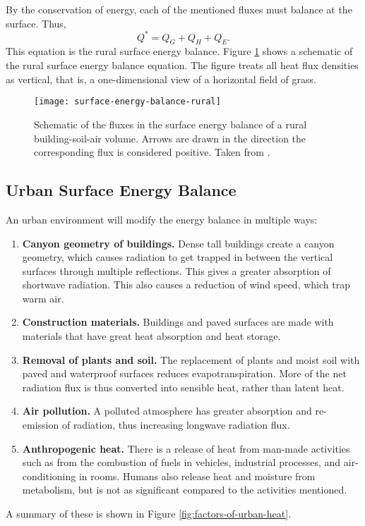 		By the conservation of energy, each of the mentioned fluxes must balance at the surface.
		Thus,
		\begin{equation}
			Q^* = Q_G + Q_H + Q_E.
		\end{equation}
		This equation is the rural surface energy balance.
		Figure \ref{fig:surface-energy-balance-rural} shows a schematic of the rural surface energy balance equation. The figure treats all heat flux densities as vertical, that is, a one-dimensional view of a horizontal field of grass.
		
		\begin{figure}	
			\centering
			\texttt{[image: surface-energy-balance-rural]}
			\caption{
				Schematic of the fluxes in the surface energy balance of a rural building-soil-air volume. 
				Arrows are drawn in the direction the corresponding flux is considered positive.
				Taken from \textcite{Oke2017urban}.
			}
			\label{fig:surface-energy-balance-rural}
		\end{figure}
		

	\subsection{Urban Surface Energy Balance}

		An urban environment will modify the energy balance in multiple ways:
		\begin{enumerate}
			\item \textbf{Canyon geometry of buildings.}
			Dense tall buildings create a canyon geometry,
				which causes radiation to get trapped in between the vertical surfaces through multiple reflections.
			This gives a greater absorption of shortwave radiation.
			This also causes a reduction of wind speed, which trap warm air.
			
			\item \textbf{Construction materials.}
			Buildings and paved surfaces are made with materials that have great heat absorption and heat storage.
			
			\item \textbf{Removal of plants and soil.}
			The replacement of plants and moist soil with paved and waterproof surfaces reduces evapotranspiration.
			More of the net radiation flux is thus converted into sensible heat, rather than latent heat.
			
			\item \textbf{Air pollution.}
			A polluted atmosphere has greater absorption and re-emission of radiation, thus increasing longwave radiation flux.
			
			\item \textbf{Anthropogenic heat.}
			There is a release of heat from man-made activities such as from
				the combustion of fuels in vehicles,
				industrial processes, and
				air-conditioning in rooms.
			Humans also release heat and moisture from metabolism, but is not as significant compared to the activities mentioned.
		\end{enumerate}
		A summary of these is shown in Figure \ref{fig:factors-of-urban-heat}.
		
